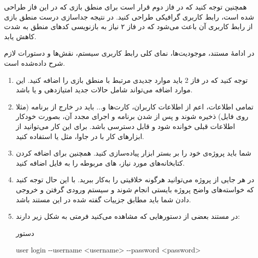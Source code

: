 \documentclass[]{article}
\begin{document}
همچنین توجه کنید که در فاز دوم قرار است برای منطق بازی که در این فاز طراحی شده است، رابط کاربری گرافیکی طراحی کنید. در نتیجه جداسازی درست منطق بازی از رابط کاربری آن باعث می‌شود که در فاز ۲ نیاز به بازنویسی کدهای منطق به شدت کاهش یابد. 

در ادامهٔ مستند، موجودیت‌ها، نمای کلی رابط کاربری سیستم، نقش‌ها و دستورات لازم شرح داده‌شده است.

\begin{enumerate}[label={نکته \arabic*:}]
	
	\item
	توجه کنید که در فاز 2 باید موارد جدیدی مرتبط با منطق بازی را  اضافه کنید. این موارد اضافه می‌تواند شامل حالات جدید امتیازدهی و یا  باشد.
	
\item
 تمامی اطلاعات، اعم از اطلاعات کاربران، کارت‌ها و... باید در خارج از برنامه (مثلا روی فایل) ذخیره شوند و پس از  شدن برنامه و اجرای مجدد آن، بصورت خودکار اطلاعات قبلی خوانده شود و قابل دسترسی باشد. برای این کار می‌توانید از ابزارهای کار با  در جاوا، مثل
  \href{https://www.tutorialspoint.com/gson/gson_quick_guide.htm}{\textcolor{blue}{}}
یا
  \href{https://github.com/amogilev/yagson}{\textcolor{blue}{}}
   استفاده‌ کنید.

\item
شما باید پروژه‌ی خود را بر بستر ابزار  پیاده‌سازی کنید. همچنین برای اضافه کردن کتابخانه‌های مورد نیاز،  های مربوطه را به فایل  اضافه کنید.




   

\item
در هر جایی از پروژه می‌توانید هرگونه خلاقیتی را به‌کار ببرید. با این حال توجه کنید که خواسته‌های واضح پروژه بایستی انجام شوند و سیستم ورودی گرفتن و خروجی دادن شما باید مطابق جزییات گفته شده در این مستند باشد.




\item
در مستند بعضی از دستور‌هایی که مشاهده می‌کنید فرمتی به شکل زیر دارند:

\begin{mybox}[colback=yellow]{دستور}
	
	
	\begin{latin}
		
	user login -{}-username <username> -{}-password <password>
		
	\end{latin}
	

\end{mybox}
\end{enumerate}
\end{document}
